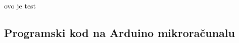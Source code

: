 \documentclass[11pt,a4paper]{report}
\author{
Kristijan Cetina \\{\small JMBAG: 2424011721} \\ {\href{mailto:kristijan.cetina@icloud.com?subject=\mailFriendlynaslovRada}{{\footnotesize kcetina@student.unipu.hr}}}}
\title{\naslovRada}
\date{Pula, \today}
\begin{document}
\pgfplotsset{width=\textwidth,compat=newest}

%


\setcounter{page}{1}





\tableofcontents
\newpage





\nocite{*}

\listoffigures
{}

\newpage

ovo je test
\appendix
\begin{appendices}\appendix
\chapter{Programski kod na Arduino mikroračunalu}\label{ArduinoSource}
\end{appendices}
\end{document}
